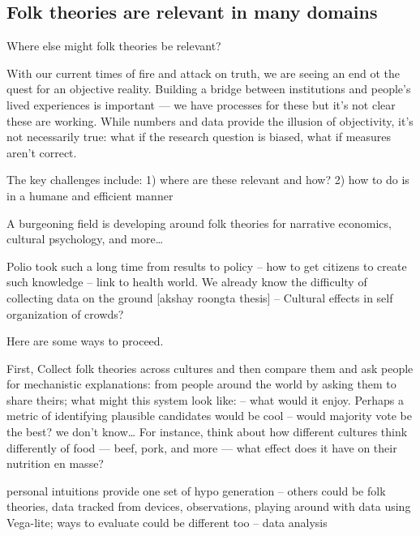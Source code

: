 

\subsection{Folk theories are relevant in many domains}
Where else might folk theories be relevant?

With our current times of fire and attack on truth, we are seeing an end ot the quest for an objective reality. Building a bridge between institutions and people’s lived experiences is important — we have processes for these but it’s not clear these are working. While numbers and data provide the illusion of objectivity, it’s not necessarily true: what if the research question is biased, what if measures aren’t correct. 

The key challenges include: 1) where are these relevant and how? 2) how to do is in a humane and efficient manner

A burgeoning field is developing around folk theories for narrative economics, cultural psychology, and more… 

Polio took such a long time from results to policy --  how to get citizens to create such knowledge -- link to health world. We already know the difficulty of collecting data on the ground [akshay roongta thesis] -- Cultural effects in self organization of crowds?

Here are some ways to proceed.

First, Collect folk theories across cultures and then compare them and ask people for mechanistic explanations: from people around the world by asking them to share theirs; what might this system look like: -- what would it enjoy. Perhaps a metric of identifying plausible candidates would be cool -- would majority vote be the best? we don't know… For instance, think about how different cultures think differently of food — beef, pork, and more — what effect does it have on their nutrition en masse?

personal intuitions provide one set of hypo generation -- others could be folk theories, data tracked from devices, observations, playing around with data using Vega-lite; ways to evaluate could be different too -- data analysis

